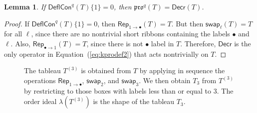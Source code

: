 \documentclass[12pt]{amsart}
\newtheorem{lemma}[theorem]{Lemma}
\theoremstyle{definition}
\theoremstyle{remark}
\numberwithin{equation}{section}
\newcommand{\pro}{\mathfrak{pro}}
\newcommand{\swap}{\ensuremath{\mathsf{swap}}}
\newcommand{\decr}{\ensuremath{\mathsf{Decr}}}
\newcommand{\rep}{\ensuremath{\mathsf{Rep}}}
\newcommand{\compress}{\ensuremath{\mathsf{DeflCon}}}
\begin{document}
\begin{lemma}\label{lem:no_ones}
If $\compress^q(T)\lbrace 1 \rbrace = 0$, then $\pro^q(T) = \decr(T)$. 
\end{lemma} 
\begin{proof}
If $\compress^q(T)\lbrace 1 \rbrace = 0$, then $\rep_{1 \rightarrow \bullet}(T) = T$. But then $\swap_\ell(T) = T$ for all $\ell$, since there are no nontrivial short ribbons containing the labels $\bullet$ and $\ell$. Also, $\rep_{\bullet \rightarrow 1}(T) = T$, since there is not $\bullet$ label in $T$. Therefore, $\decr$ is the only operator in Equation~(\ref{eq:kprodef2}) that acts nontrivially on $T$. 
\end{proof}

\begin{figure}[h]
\caption{The tableau $T^{(3)}$ is obtained from $T$ by applying in sequence the operations 
$\rep_{1 \rightarrow \bullet}$, $\swap_2$, and $\swap_3$. 
We then obtain $T_3$ from $T^{(3)}$ by restricting to 
those boxes with labels less than or equal to $3$. The order ideal
 $\lambda \left( T^{(3)} \right)$ is the 
shape of the tableau $T_3$. }\label{fig:restricted_promotions}
\end{figure}
\end{document}
